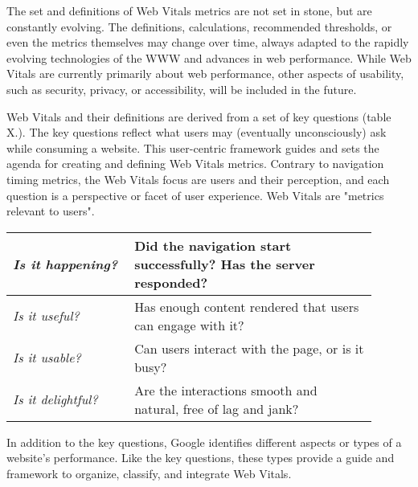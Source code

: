 
The set and definitions of Web Vitals metrics are not set in stone, but are constantly evolving.
The definitions, calculations, recommended thresholds, or even the metrics themselves may change over time, always adapted to the rapidly evolving technologies of the WWW and advances in web performance. %
While Web Vitals are currently primarily about web performance, other aspects of usability, such as security, privacy, or accessibility, will be included in the future. %


Web Vitals and their definitions are derived from a set of key questions (table X.).
The key questions reflect what users may (eventually unconsciously) ask while consuming a website. 
This user-centric framework guides and sets the agenda for creating and defining Web Vitals metrics.
Contrary to navigation timing metrics, the Web Vitals focus are users and their perception, and each question is a perspective or facet of user experience.
Web Vitals are "metrics relevant to users". %

 
\begin{center}
\small
	\begin{tabular}{  p{0.3\linewidth} | p{0.6\linewidth}  }
	\textit{Is it happening?} & Did the navigation start successfully? Has the server responded? \\
	\hline
	\textit{Is it useful?} & Has enough content rendered that users can engage with it? \\
	\hline
	\textit{Is it usable?} & Can users interact with the page, or is it busy? \\
	\hline
	\textit{Is it delightful?} & Are the interactions smooth and natural, free of lag and jank? \\
	\end{tabular}
\end{center}



In addition to the key questions, Google identifies different aspects or types of a website's performance.
Like the key questions, these types provide a guide and framework to organize, classify, and integrate Web Vitals. %

